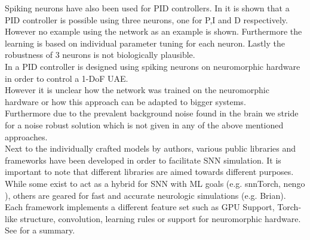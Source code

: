 Spiking neurons have also been used for PID controllers. In \cite{lu_spiking_2011} it is shown that a PID controller is possible using three neurons, one for P,I and D respectively. However no example using the network as an example is shown. Furthermore the learning is based on individual parameter tuning for each neuron. Lastly the robustness of 3 neurons is not biologically plausible.\\
In \cite{stagsted_towards_2020} a PID controller is designed using spiking neurons on neuromorphic hardware in order to control a 1-DoF UAE.\\
However it is unclear how the network was trained on the neuromorphic hardware or how this approach can be adapted to bigger systems.\\
Furthermore due to the prevalent background noise found in the brain we stride for a noise robust solution which is not given in any of the above mentioned approaches.\\
Next to the individually crafted models by authors, various public libraries and frameworks have been developed in order to facilitate \ac{SNN} simulation. It is important to note that different libraries are aimed towards different purposes. While some exist to act as a hybrid for \ac{SNN} with \ac{ML} goals (e.g. snnTorch\cite{eshraghian_training_2023}, nengo \cite{bekolay_nengo_2014}), others are geared for fast and accurate neurologic simulations (e.g. Brian\cite{stimberg_brian_2019}). Each framework implements a different feature set such as \ac{GPU} Support, Torch-like structure, convolution, learning rules or support for neuromorphic hardware. See \cite{yamazaki_spiking_2022} for a summary.

